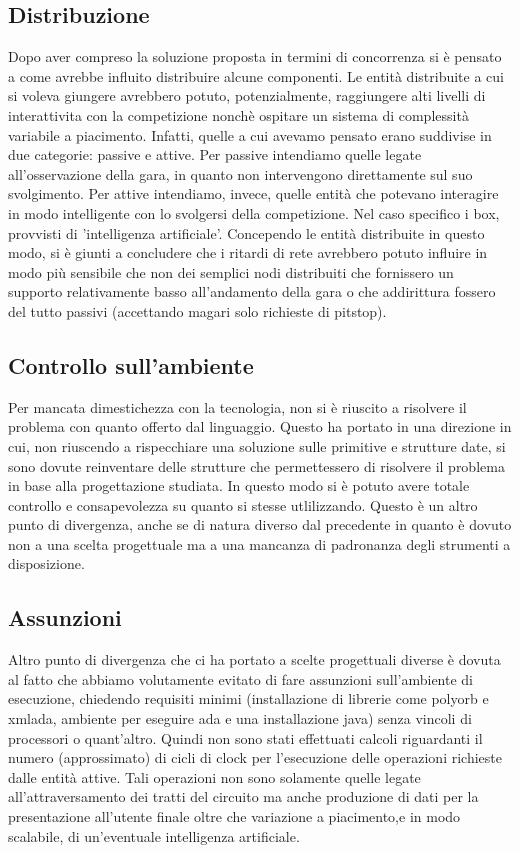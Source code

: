 \subsection{Distribuzione}
Dopo aver compreso la soluzione proposta in termini di concorrenza si è pensato a come avrebbe influito distribuire alcune componenti. Le entità distribuite a cui si voleva giungere avrebbero potuto, potenzialmente, raggiungere alti livelli di interattivita con la competizione nonchè ospitare un sistema di complessità variabile a piacimento.
Infatti, quelle a cui avevamo pensato erano suddivise in due categorie: passive e attive. Per passive intendiamo quelle legate all'osservazione della gara, in quanto non intervengono direttamente sul suo svolgimento. Per attive intendiamo, invece, quelle entità che potevano interagire in modo intelligente con lo svolgersi della competizione. Nel caso specifico i box, provvisti di 'intelligenza artificiale'. Concependo le entità distribuite in questo modo, si è giunti a concludere che i ritardi di rete avrebbero potuto influire in modo più sensibile che non dei semplici nodi distribuiti che fornissero un supporto relativamente basso all'andamento della gara o che addirittura fossero del tutto passivi (accettando magari solo richieste di pitstop).
\subsection{Controllo sull'ambiente}
Per mancata dimestichezza con la tecnologia, non si è riuscito a risolvere il problema con quanto offerto dal linguaggio. Questo ha portato in una direzione in cui, non riuscendo a rispecchiare una soluzione sulle primitive e strutture date, si sono dovute reinventare delle strutture che permettessero di risolvere il problema in base alla progettazione studiata. In questo modo si è potuto avere totale controllo e consapevolezza su quanto si stesse utlilizzando. Questo è un altro punto di divergenza, anche se di natura diverso dal precedente in quanto è dovuto non a una scelta progettuale ma a una mancanza di padronanza degli strumenti a disposizione.
\subsection{Assunzioni}
Altro punto di divergenza che ci ha portato a scelte progettuali diverse è dovuta al fatto che abbiamo volutamente evitato di fare assunzioni sull'ambiente di esecuzione, chiedendo requisiti minimi (installazione di librerie come polyorb e xmlada, ambiente per eseguire ada e una installazione java) senza vincoli di processori o quant'altro. Quindi non sono stati effettuati calcoli riguardanti il numero (approssimato) di cicli di clock per l'esecuzione delle operazioni richieste dalle entità attive. Tali operazioni non sono solamente quelle legate all’attraversamento dei tratti del circuito ma anche produzione di dati per la presentazione all'utente finale oltre che variazione a piacimento,e in modo scalabile, di un'eventuale intelligenza artificiale.
